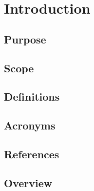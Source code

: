 \section{Introduction}
  \subsection{Purpose}
  \subsection{Scope}
  \subsection{Definitions}
  \subsection{Acronyms}
  \subsection{References}
  \subsection{Overview}

